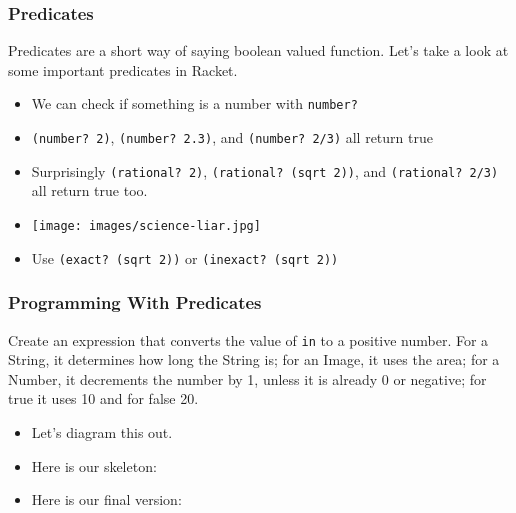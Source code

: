 \documentclass{beamer}
\begin{document}
\begin{frame}
  \frametitle{Predicates}
  Predicates are a short way of saying boolean valued function. Let's take
  a look at some important predicates in Racket.
  \begin{itemize}
  \item<2-> We can check if something is a number with \texttt{number?}
  \item<3-> \texttt{(number? 2)}, \texttt{(number? 2.3)}, and \texttt{(number? 2/3)} all return true
  \item<4-> Surprisingly \texttt{(rational? 2)}, \texttt{(rational? (sqrt 2))}, and \texttt{(rational? 2/3)} all return true too.
  \item<5-> \texttt{[image: images/science-liar.jpg]}
  \item<6-> Use \texttt{(exact? (sqrt 2))} or \texttt{(inexact? (sqrt 2))}
  \end{itemize}
\end{frame}


\begin{frame}
  \frametitle{Programming With Predicates}
  Create an expression that converts the value of \texttt{in} to a positive number. For a String, it determines how long the String is; for an Image, it uses the area; for a Number, it decrements the number by 1, unless it is already 0 or negative; for true it uses 10 and for false 20.
\begin{itemize}
\item<2-> Let's diagram this out.
\item<3-> Here is our skeleton: \predicateSkeleton
\item<4-> Here is our final version: \predicateFinal
\end{itemize}

\end{frame}
\end{document}
